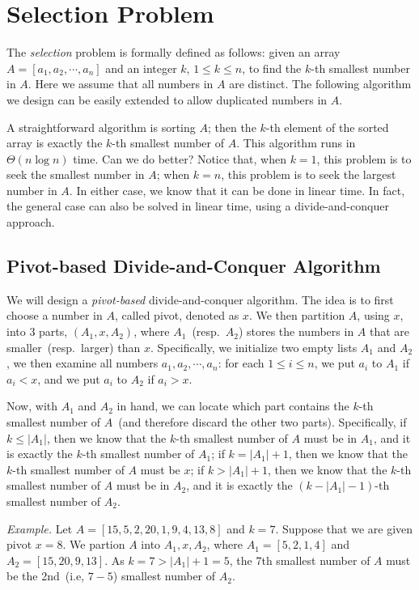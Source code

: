 \section{Selection Problem}

The \emph{selection} problem is formally defined as follows: given an array $A = [a_1,a_2, \cdots, a_n]$ and
an integer $k$, $1 \le k \le n$, to find the $k$-th smallest number in $A$.
Here we assume that all numbers in $A$ are distinct. The following algorithm
we design can be easily extended to allow duplicated numbers in $A$.

A straightforward algorithm is sorting $A$; then the $k$-th element of the sorted array is exactly
the $k$-th smallest number of $A$. This algorithm runs in $\Theta(n\log n)$ time. Can we do better?
Notice that, when $k = 1$, this problem is to seek the smallest number in $A$;
when $k = n$, this problem is to seek the largest number in $A$.
In either case, we know that it can be done in linear time.
In fact, the general case can also be solved in linear time, using a divide-and-conquer approach.

\subsection*{Pivot-based Divide-and-Conquer Algorithm}

We will design a \emph{pivot-based} divide-and-conquer algorithm.
The idea is to first choose a number in $A$, called pivot, denoted as $x$.
We then partition $A$, using $x$, into 3 parts, $(A_1, x, A_2)$, where $A_1$~(resp.\ $A_2$) stores the numbers in $A$
that are smaller~(resp.\ larger) than $x$.
Specifically, we initialize two empty lists $A_1$ and $A_2$,
we then examine all numbers $a_1, a_2, \cdots, a_n$: for each $1\le i \le n$, we put $a_i$ to $A_1$ if $a_i < x$,
and we put $a_i$ to $A_2$ if $a_i > x$.

Now, with $A_1$ and $A_2$ in hand, we can locate which part contains the $k$-th smallest number of $A$~(and therefore discard the other two parts).
Specifically, if $k \le |A_1|$, then we know that the $k$-th smallest number of $A$ must be in $A_1$,
and it is exactly the $k$-th smallest number of $A_1$;
if $k = |A_1| + 1$, then we know that the $k$-th smallest number of $A$ must be $x$;
if $k > |A_1| + 1$, then we know that the $k$-th smallest number of $A$ must be in $A_2$,
and it is exactly the $(k-|A_1|-1)$-th smallest number of $A_2$.

\emph{Example.} Let $A = [15, 5, 2, 20, 1, 9, 4, 13, 8]$ and $k = 7$.
Suppose that we are given pivot $x = 8$. We partion $A$ into $A_1, x, A_2$,
where $A_1 = [5, 2, 1, 4]$ and $A_2 = [15, 20, 9, 13]$.
As $k = 7 > |A_1| + 1 = 5$, the 7th smallest number of $A$
must be the 2nd~(i.e, $7-5$) smallest number of $A_2$.

